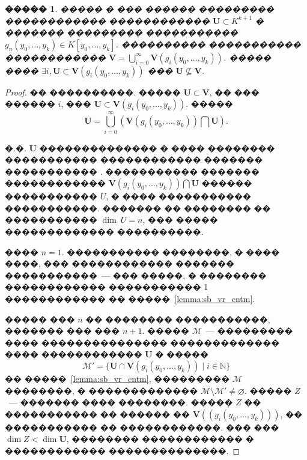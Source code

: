 \documentclass[16pt]{article}
\theoremstyle{plain}
\newtheorem{lemma}[theorem]{�����}
\theoremstyle{definition}
\theoremstyle{remark}
\begin{document}
\begin{lemma} \label{lemma:o vlojenii}
����� � ��� ������ ��������� ������������ ������������
$\mathbf{U}\subset K^{k+1}$ � ������� ��������� �����������
$g_n(y_0,\ldots, y_k)\in K[y_0,\ldots, y_k ]$. ���������� �����������
������������ $ \mathbf{V}=\bigcup\limits
_{i=0}^{\infty}\mathbf{V}(g_i(y_0,\ldots, y_k))$. ����� ����
$\exists i, \mathbf{U} \subset \mathbf{V}(g_i(y_0,\ldots, y_k))$ ���
$\mathbf{U}\nsubseteq \mathbf{V}$.
\end{lemma}



\begin{proof}
�� ����������. ����� $\mathbf{U}\subset \mathbf{V}$, �� ��� ������
$i$, ��� $\mathbf{U} \subset \mathbf{V}(g_i(y_0,\ldots, y_k))$.
�����
$$
\mathbf{U}=\bigcup\limits_{i=0}^{\infty}(\mathbf{V}(g_i(y_0,\ldots,
y_k))\bigcap \mathbf{U}).
$$


�.�. $\mathbf{U}$ �������������� � ���� �������� �����������
������������ ������� ����������� . ����������� ������� ������������
$\mathbf{V}(g_i(y_0,\ldots, y_k))\bigcap \mathbf{U}$ ������
����������� $U$, � ���� ����������� �����������. ������� �� ��������
�� ����������� $\dim~U=n$,
��� ����� ������������� ����������.

���� $n=1$. ����������� ��������, � ���� ����, ��� ������������
������� �����������~--- ��� �����, � �������� ������������
����������� 1 ������������ �� �����~\ref{lemma:sb_vr_cntm}.




 ����� ��� $n$ �� �������� �����������, ������� ��� ��� $n+1$.
����� $\mathcal M$~--- ��������� ���� ��������������� �������������
���� ������������ $\mathbf{U}$ � �����
$$
\mathcal M' = \{ \mathbf{U}\cap \mathbf{V}(g_i(y_0,\ldots,y_k))\mid
i\in \mathbb N \}
$$
�� �����~\ref{lemma:sb_vr_cntm}, ��������� $\mathcal M$ ��������, �
������������� $\mathcal M\setminus\mathcal M'\neq \varnothing$.
����� $Z$~--- ������� ���� ��������. ����� $Z$ �� ����������� ��
������ �� $\mathbf{V}((g_i(y_0,\ldots,y_k)))$, �� ����������� ��
������������. ��� ��� $\dim Z<\dim \mathbf{U}$, ��������
������������ � ������������ ��������������.



\end{proof}
\end{document}
